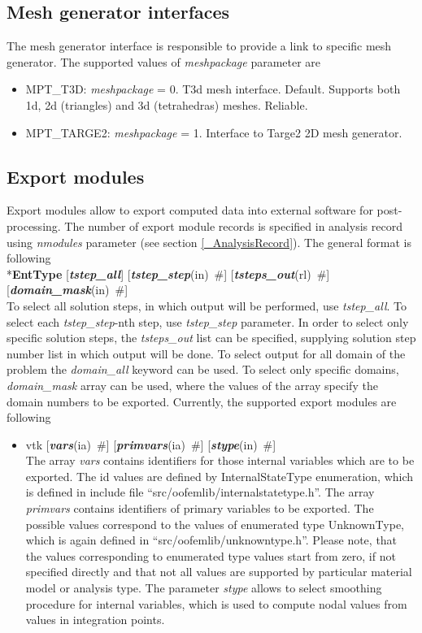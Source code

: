 \documentclass[draft]{article}
\newcommand{\param}[1]{{\em #1}}
\newcommand{\keywordnotype}[1]{\mbox{{\it{\bf{#1}}}}}
\newcommand{\keyword}[2]{\mbox{{\keywordnotype{#1}\tiny (#2)}}}
\newcommand{\entKeyword}[1]{\mbox{{*{\bf{#1}}}}}
\newcommand{\field}[2]{\mbox{\keyword{#1}{#2}~\#}}
\newcommand{\optField}[2]{\mbox{[\field{#1}{#2}]}}
\begin{document}
\subsection{Mesh generator interfaces}
\label{meshpackages}
The mesh generator interface is responsible to provide a link to
specific mesh generator. The supported values of \param{meshpackage}
parameter are 
\begin{itemize}
\item
MPT\_T3D:  \param{meshpackage} = 0. T3d mesh interface. Default. Supports both 1d, 2d
(triangles) and 3d (tetrahedras) meshes. Reliable.
\item
MPT\_TARGE2:	\param{meshpackage} = 1. Interface to Targe2 2D
mesh generator.
\end{itemize}
%

\subsection{Export modules}
\label{ExportModulesSec}
Export modules allow to export computed data into external software for
post-processing. The number of export module records is specified in
analysis record using \param{nmodules} parameter (see section \ref{_AnalysisRecord}). The general format
is following\\
\entKeyword{EntType} [\keywordnotype{tstep\_all}]
\optField{tstep\_step}{in} \optField{tsteps\_out}{rl}\newline
[\keywordnotype{domain\_all}] \optField{domain\_mask}{in}\\

To select all solution steps, in which output will be performed, use
\param{tstep\_all}. To select each \param{tstep\_step}-nth step, use
\param{tstep\_step} parameter. In order to select only specific
solution steps, the \param{tsteps\_out} list can be specified,
supplying solution step number list in which output will be done.
To select output for all domain of the problem the \param{domain\_all}
keyword can be used. To select only specific domains,
\param{domain\_mask} array can be used, where the values of the array
specify the domain numbers to be exported.
Currently, the supported export modules are following
\begin{itemize}
\item vtk \optField{vars}{ia} \optField{primvars}{ia}
\optField{stype}{in}\\
The array \param{vars} contains identifiers for those internal
variables which are to be exported. The id values are defined by
InternalStateType enumeration, which is defined in include file
``src/oofemlib/internalstatetype.h''.
The array \param{primvars}
contains identifiers of primary variables to be exported.
The possible values correspond to the values of enumerated type
UnknownType, which is again defined in ``src/oofemlib/unknowntype.h''.
Please note, that the values corresponding to enumerated type values
start from zero, if not specified directly and that not all values are
supported by particular material model or analysis type.
The parameter \param{stype} allows to select smoothing procedure for
internal variables, which is used to compute nodal values from values
in integration points.
\end{itemize}
\end{document}
